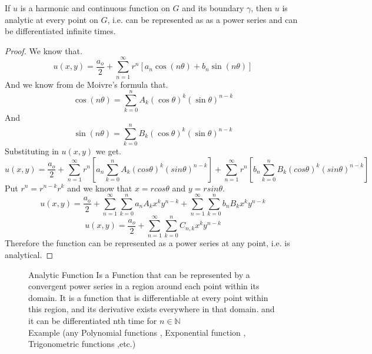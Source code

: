 \begin{theorem}
    If $u$ is a harmonic and continuous function on $G$ and its boundary $\gamma$, then $u$ is analytic at every point on $G$, i.e. can be represented as as a power series and can be differentiated infinite times.    
\end{theorem}
\begin{proof}[\textcolor{theme}{Proof}]
    We know that.       
    \[
        u(x,y) = \frac{a_o}{2} + \sum_{n=1}^{\infty} r^n[a_n \cos(n\theta)+b_n \sin(n\theta)]    
    \]
    And we know from de Moivre's formula that.
    \[
        \cos(n\theta) = \sum_{k=0}^{n} A_k {(\cos\theta)}^k {(\sin\theta)}^{n-k}    
    \]
    And
    \[
        \sin(n\theta) =  \sum_{k=0}^{n} B_k {(\cos\theta)}^k {(\sin\theta)}^{n-k}    
    \]
    Substituting in $u(x,y)$ we get.
    \[
        u(x,y) = \frac{a_o}{2} + \sum_{n=1}^{\infty} r^n\left[a_n\sum_{k=0}^{n} A_k (cos\theta)^k (sin\theta)^{n-k}\right] + \sum_{n=1}^{\infty} r^n\left[b_n\sum_{k=0}^{n} B_k (cos\theta)^k (sin\theta)^{n-k}\right]    
    \]
    Put $r^n = r^{n-k}r^k $ and we know that $x = rcos\theta$ and $y=rsin\theta$.
    \[
        u(x,y) = \frac{a_o}{2} + \sum_{n=1}^{\infty}\sum_{k=0}^{n} a_n A_k x^k y^{n-k} + \sum_{n=1}^{\infty}\sum_{k=0}^{n}b_n B_k x^k y^{n-k}    
    \]
    \[
        u(x,y) = \frac{a_o}{2} + \sum_{n=1}^{\infty}\sum_{k=0}^{n} C_{n,k} x^k y^{n-k}
    \]
    Therefore the function can be represented as a power series at any point, i.e. is analytical.
\end{proof}
\begin{figure}[b]
    \begin{minipage}[h]{\textwidth}
    \begin{enrichment*}{Analytic Function}
        Is a Function that can be represented by a convergent power series in a region around each point within its domain. It is a function that is differentiable at every point within this region, and its derivative exists everywhere in that domain. 
        and it can be differentiated nth time for $n \in \mathbb{N}$
        \\
        Example (any Polynomial functions , Exponential function , Trigonometric functions ,etc.)
    \end{enrichment*}        
\end{minipage}
\end{figure}
\newpage
\setcounter{equation}{0}
